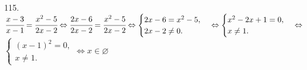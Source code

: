 115. $\cfrac{x-3}{x-1}=\cfrac{x^2-5}{2x-2}\Leftrightarrow \cfrac{2x-6}{2x-2}=\cfrac{x^2-5}{2x-2}\Leftrightarrow
\begin{cases} 2x-6=x^2-5,\\ 2x-2\neq0.\end{cases}\Leftrightarrow
\begin{cases} x^2-2x+1=0,\\ x\neq1.\end{cases}\Leftrightarrow$\\$
\begin{cases} (x-1)^2=0,\\ x\neq1.\end{cases}\Leftrightarrow x\in \varnothing$\\
